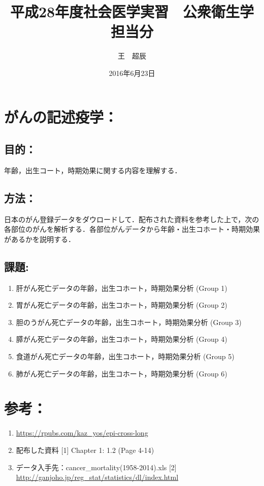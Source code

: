 \documentclass[11pt,]{article}
\title{平成28年度社会医学実習　公衆衛生学担当分}
\author{王　超辰}
\date{2016年6月23日}
\begin{document}
\maketitle

\section{がんの記述疫学：}

\subsection{目的：}

年齢，出生コート，時期効果に関する内容を理解する．

\subsection{方法：}

日本のがん登録データをダウロードして．配布された資料を参考した上で，次の各部位のがんを解析する．各部位がんデータから年齢・出生コホート・時期効果があるかを説明する．

\subsection{課題:}

\begin{enumerate}
\def\labelenumi{\arabic{enumi}.}
\item
  肝がん死亡データの年齢，出生コホート，時期効果分析 (Group 1)
\item
  胃がん死亡データの年齢，出生コホート，時期効果分析 (Group 2)
\item
  胆のうがん死亡データの年齢，出生コホート，時期効果分析 (Group 3)
\item
  膵がん死亡データの年齢，出生コホート，時期効果分析 (Group 4)
\item
  食道がん死亡データの年齢，出生コホート，時期効果分析 (Group 5)
\item
  肺がん死亡データの年齢，出生コホート，時期効果分析 (Group 6)
\end{enumerate}

\section{参考：}

\begin{enumerate}
\def\labelenumi{\arabic{enumi}.}
\item
  \url{https://rpubs.com/kaz_yos/epi-cross-long}
\item
  配布した資料 {[}1{]} Chapter 1: 1.2 (Page 4-14)
\item
  データ入手先：cancer\_mortality(1958-2014).xls {[}2{]}
  \url{http://ganjoho.jp/reg_stat/statistics/dl/index.html}
\end{enumerate}
\end{document}
